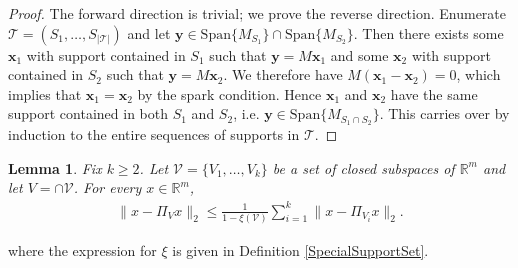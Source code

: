\documentclass[journal, onecolumn]{IEEEtran}
\newtheorem{lemma}{Lemma}
\begin{document}
\begin{proof}The forward direction is trivial; we prove the reverse direction. Enumerate $\mathcal{T} = (S_1, \ldots, S_{|\mathcal{T}|})$ and let $\mathbf{y} \in \text{Span}\{M_{S_1}\} \cap \text{Span}\{M_{S_2}\}$. Then there exists some $\mathbf{x}_1$ with support contained in $S_1$ such that $\mathbf{y} = M\mathbf{x}_1$ and some $\mathbf{x}_2$ with support contained in $S_2$ such that $\mathbf{y} = M\mathbf{x}_2$. We therefore have $M(\mathbf{x}_1 - \mathbf{x}_2) = 0$, which implies that $\mathbf{x}_1 = \mathbf{x}_2$ by the spark condition. Hence $\mathbf{x}_1$ and $\mathbf{x}_2$ have the same support contained in both $S_1$ and $S_2$, i.e. $\mathbf{y} \in \text{Span}\{M_{S_1 \cap S_2}\}$. This carries over by induction to the entire sequences of supports in $\mathcal{T}$. 
\end{proof}


\begin{lemma}\label{DistanceToIntersectionLemma}
Fix $k \geq 2$. Let $\mathcal{V} = \{V_1, \ldots, V_k\}$ be a set of closed subspaces of $\mathbb{R}^m$ and let $V = \cap \mathcal{V}$. For every $x \in \mathbb{R}^m$,
\begin{align}\label{DTILeq}
\|x - \Pi_V x\|_2 \leq \frac{1}{1 - \xi(\mathcal{V})} \sum_{i=1}^k \|x - \Pi_{V_i} x\|_2.
\end{align}
\end{lemma}
%
where the expression for $\xi$ is given in Definition \ref{SpecialSupportSet}.
\end{document}
